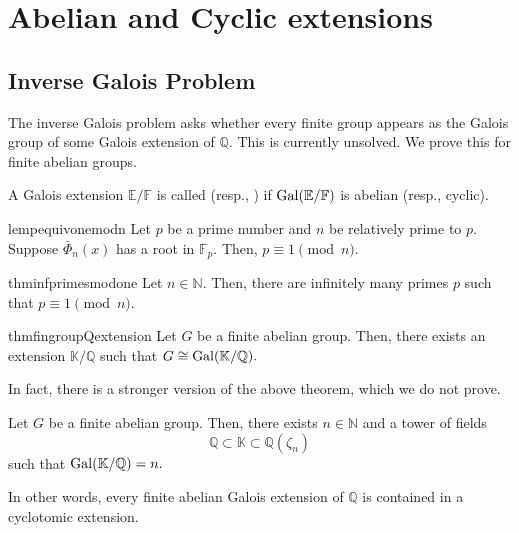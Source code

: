 \chapter{Abelian and Cyclic extensions}

\section{Inverse Galois Problem}
The inverse Galois problem asks whether every finite group appears as the Galois group of some Galois extension of $\mathbb{Q}.$ This is currently unsolved. We prove this for finite abelian groups.

\begin{defn}%
	A Galois extension $\mathbb{E}/\mathbb{F}$ is called  (resp., ) if $\operatorname{Gal}(\mathbb{E}/\mathbb{F})$ is abelian (resp., cyclic).
\end{defn}

\begin{restatable}[]{lem}{pequivonemodn}
\label{lem:pequivonemodn}
	Let $p$ be a prime number and $n$ be relatively prime to $p.$ Suppose $\bar{\Phi}_n(x)$ has a root in $\mathbb{F}_p.$ Then, $p \equiv 1 \pmod{n}.$ \hfill\hyperref[lem:pequivonemodn2]{\downsym}
\end{restatable}

\begin{restatable}[]{thm}{infprimesmodone}
\label{thm:infprimesmodone}
	Let $n \in \mathbb{N}.$ Then, there are infinitely many primes $p$ such that $p \equiv 1 \pmod{n}.$ \hfill\hyperref[thm:infprimesmodone2]{\downsym}
\end{restatable}

\begin{restatable}[]{thm}{fingroupQextension}
\label{thm:fingroupQextension}
	Let $G$ be a finite abelian group. Then, there exists an extension $\mathbb{K}/\mathbb{Q}$ such that $G \cong \operatorname{Gal}(\mathbb{K}/\mathbb{Q}).$ \hfill\hyperref[thm:fingroupQextension2]{\downsym}
\end{restatable}

In fact, there is a stronger version of the above theorem, which we do not prove.

\begin{thm}
	Let $G$ be a finite abelian group. Then, there exists $n \in \mathbb{N}$ and a tower of fields
	\begin{equation*} 
		\mathbb{Q} \subset \mathbb{K} \subset \mathbb{Q}(\zeta_n)
	\end{equation*}
	such that $\operatorname{Gal}(\mathbb{K}/\mathbb{Q}) = n.$

	In other words, every finite abelian Galois extension of $\mathbb{Q}$ is contained in a cyclotomic extension.
\end{thm}

